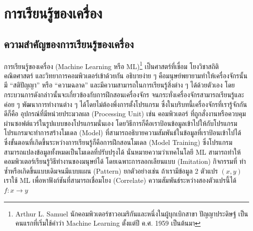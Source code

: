 

\chapter{การเรียนรู้ของเครื่อง}
\label{ch:ml}


\section{ความสำคัญของการเรียนรู้ของเครื่อง}
\label{sec:why_ml}

การเรียนรู้ของเครื่อง (Machine Learning หรือ ML)\footnote{Arthur L. Samuel นักคอมพิวเตอร์ชาวอเมริกันและหนึ่งในผู้บุกเบิกสาขา%
ปัญญาประดิษฐ์ เป็นคนแรกที่เริ่มใช้คำว่า Machine Learning ตั้งแต่ปี ค.ศ. 1959 เป็นต้นมา\autocite{samuel1959}} เป็นศาสตร์ที่เชื่อม%
โยงวิชาสถิติ คณิตศาสตร์ และวิทยาการคอมพิวเตอร์เข้าด้วยกัน อธิบายง่าย ๆ คือมนุษย์พยายามทำให้เครื่องจักรนั้นมี \enquote{สติปัญญา} หรือ 
\enquote{ความฉลาด} และมีความสามารถในการเรียนรู้สิ่งต่าง ๆ ได้ด้วยตัวเอง โดยกระบวนการดังกล่าวนั้นจะเกี่ยวข้องกับการฝึกสอนเครื่องจักร%
จนกระทั่งเครื่องจักรสามารถเรียนรู้และค่อย ๆ พัฒนาการทำงานต่าง ๆ ได้โดยไม่ต้องพึ่งการตั้งโปรแกรม ซึ่งในบริบทนี้เครื่องจักรที่เรารู้จักกันดีก็คือ%
อุปกรณ์ที่มีหน่วยประมวลผล (Processing Unit) เช่น คอมพิวเตอร์ ที่ถูกสั่งงานหรือควบคุมผ่านซอฟต์แวร์ในรูปแบบของโปรแกรมนั่นเอง 
โดยวิธีการก็คือเราป้อนข้อมูลเข้าไปให้กับโปรแกรม โปรแกรมจะทำการสร้างโมเดล (Model) ที่สามารถอธิบายความสัมพันธ์ในข้อมูลที่เราป้อนเข้าไปได้ 
ซึ่งขั้นตอนที่เกิดขึ้นระหว่างการเรียนรู้ก็คือการฝึกสอนโมเดล (Model Training) ซึ่งโปรแกรมสามารถแปลงข้อมูลทั้งหมดเป็นโมเดลที่ปรับปรุงได้ 
นั่นหมายความว่าเทคโนโลยี ML สามารถทำให้คอมพิวเตอร์เรียนรู้วิธีทำงานของมนุษย์ได้ โดยเฉพาะการลอกเลียนแบบ (Imitation) กิจกรรมที่%
ทำซ้ำหรือเกิดขึ้นแบบเดิมจนมีแบบแผน (Pattern) ยกตัวอย่างเช่น ถ้าเรามีข้อมูล 2 ตัวแปร $(x,y)$ เราใช้ ML เพื่อหาฟังก์ชันที่สามารถเชื่อมโยง 
(Correlate) ความสัมพันธ์ระหว่างสองตัวแปรนี้ได้ $f: x\rightarrow y$

